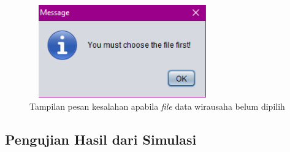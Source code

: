 	\begin{figure} [H]
	\centering  
	\includegraphics[width=8cm, height=4cm]{pesanError6} 
		\caption[Tampilan pesan kesalahan apabila \textit{file} data wirausaha belum dipilih]{Tampilan pesan kesalahan apabila \textit{file} data wirausaha belum dipilih}
	\label{pesanError6} 
\end{figure}

 
\subsection{Pengujian Hasil dari Simulasi}